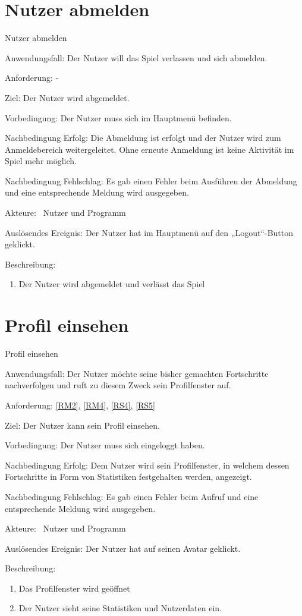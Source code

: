 \section{Nutzer abmelden}
\begin{function}{30}{Nutzer abmelden}
\item[Anwendungsfall:] Der Nutzer will das Spiel verlassen und sich abmelden.
\item[Anforderung:] -
\item[Ziel:] Der Nutzer wird abgemeldet.
\item[Vorbedingung:] Der Nutzer muss sich im Hauptmenü befinden.
\item[Nachbedingung Erfolg:]  Die Abmeldung ist erfolgt und der Nutzer wird zum Anmeldebereich weitergeleitet. Ohne erneute Anmeldung ist keine Aktivität im Spiel mehr möglich.
\item[Nachbedingung Fehlschlag:] Es gab einen Fehler beim Ausführen der Abmeldung und eine entsprechende Meldung wird ausgegeben.
\item[Akteure:] ~Nutzer und Programm
\item[Auslösendes Ereignis:] Der Nutzer hat im Hauptmenü auf den „Logout“-Button geklickt.
\item[Beschreibung:] ~
\begin{enumerate}
  \item  Der Nutzer wird abgemeldet und verlässt das Spiel
\end{enumerate}
\end{function}

\section{Profil einsehen}
\begin{function}{40}{Profil einsehen}
\item[Anwendungsfall:] Der Nutzer möchte seine bisher gemachten Fortschritte nachverfolgen und ruft zu diesem Zweck sein Profilfenster auf.
\item[Anforderung:] \ref{RM2}, \ref{RM4}, \ref{RS4}, \ref{RS5}
\item[Ziel:] Der Nutzer kann sein Profil einsehen.
\item[Vorbedingung:] Der Nutzer muss sich eingeloggt haben.
\item[Nachbedingung Erfolg:]  Dem Nutzer wird sein Profilfenster, in welchem dessen Fortschritte in Form von Statistiken festgehalten werden, angezeigt.
\item[Nachbedingung Fehlschlag:] Es gab einen Fehler beim Aufruf und eine entsprechende Meldung wird ausgegeben.
\item[Akteure:] ~Nutzer und Programm
\item[Auslösendes Ereignis:] Der Nutzer hat auf seinen Avatar geklickt.
\item[Beschreibung:] ~
\begin{enumerate}
  \item  Das Profilfenster wird geöffnet
  \item  Der Nutzer sieht seine Statistiken und Nutzerdaten ein.
\end{enumerate}
\end{function}

